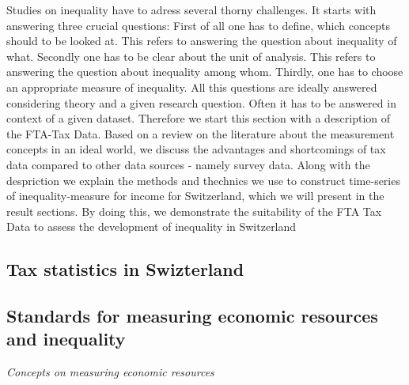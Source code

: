 \documentclass[twoside]{article}\usepackage[]{graphicx}\usepackage[]{color}
\begin{document}
\begin{multicols}{2}
Studies on inequality have to adress several thorny challenges. It starts with answering three crucial questions: First of all one has to define, which concepts should to be looked at. This refers to answering the question about inequality of what. Secondly one has to be clear about the unit of analysis. This refers to answering the question about inequality among whom. Thirdly, one has to choose an appropriate measure of inequality. All this questions are ideally answered considering theory and a given research question. Often it has to be answered in context of a given dataset. Therefore we start this section with a description of the FTA-Tax Data. Based on a review on the literature about the measurement concepts in an ideal world, we discuss  the advantages and shortcomings of tax data compared to other data sources - namely survey data. Along with the despriction we explain the methods and thechnics we use to construct time-series of inequality-measure for income for Switzerland, which we will present in the result sections. By doing this, we demonstrate the suitability of the FTA Tax Data to assess the development of inequality in Switzerland

\subsection{Tax statistics in Swizterland}


\subsection{Standards for measuring economic resources and inequality}

\emph{Concepts on measuring economic resources}  \\


\end{multicols}
\end{document}
